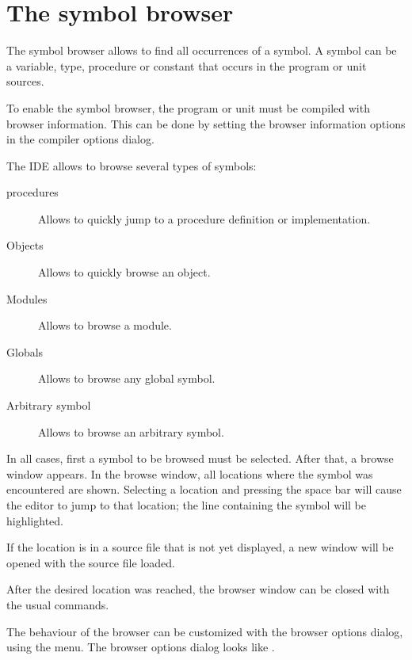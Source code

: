 \section{The symbol browser}
\label{se:browser}
The symbol browser allows to find all occurrences of a symbol. A symbol 
can be a variable, type, procedure or constant that occurs in the
program or unit sources.

To enable the symbol browser, the program or unit must be compiled with
browser information. This can be done by setting the browser information
options in the compiler options dialog.

The IDE allows to browse several types of symbols:
\begin{description}
\item[procedures] Allows to quickly jump to a procedure definition or
implementation.
\item[Objects] Allows to quickly browse an object.
\item[Modules] Allows to browse a module.
\item[Globals] Allows to browse any global symbol.
\item[Arbitrary symbol] Allows to browse an arbitrary symbol.
\end{description}
In all cases, first a symbol to be browsed must be selected. After that,
a browse window appears. In the browse window, all locations where the 
symbol was encountered are shown. Selecting a location and pressing the
space bar will cause the editor to jump to that location; the line
containing the symbol will be highlighted. 

If the location is in a source file that is not yet displayed, a new 
window will be opened with the source file loaded.

After the desired location was reached, the browser window can be closed 
with the usual commands. 

The behaviour of the browser can be customized with the browser options
dialog, using the  menu.
The browser options dialog looks like .


